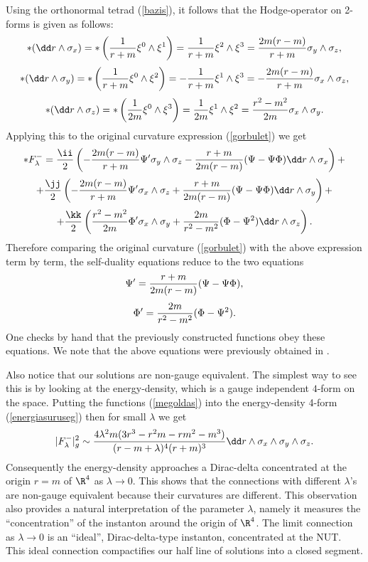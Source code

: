 \documentclass[a4paper,12pt,draft]{article}
\begin{document}
Using the orthonormal tetrad (\ref{bazis}), it follows that the
Hodge-operator on 2-forms is given as follows: 
\[*(\dd r\wedge \sigma_x)= *\left({1\over
r+m}\xi^0\wedge\xi^1   \right)={1\over r+m}\xi^2\wedge\xi^3 =
{2m(r-m)\over r+m}\sigma_y\wedge \sigma_z,\] 
\[*(\dd r\wedge \sigma_y)= *\left({1\over
r+m}\xi^0\wedge\xi^2\right)=-{1\over r+m}\xi^1\wedge\xi^3 =-{2m(r-m)\over
r+m}\sigma_x\wedge \sigma_z,\]
\[*(\dd r\wedge \sigma_z)= *\left({1\over 2m}\xi^0\wedge\xi^3\right)=
{1\over 2m}\xi^1 \wedge\xi^2 = {r^2-m^2\over 2m} \sigma_x\wedge \sigma_y. 
\]
Applying this to the original curvature
expression (\ref{gorbulet}) we get 
\[*F^-_\lambda ={\ii\over 2}\left(-{2m(r-m)\over
r+m}\Psi '\sigma_y\wedge\sigma_z-{r+m\over 2m(r-m)}(\Psi -\Psi\Phi )\dd
r\wedge\sigma_x\right)+   \]
\[+{\jj\over 2}\left( -{2m(r-m)\over r+m}\Psi '\sigma_x\wedge\sigma_z+
{r+m\over 2m(r-m)}(\Psi -\Psi\Phi )\dd r\wedge\sigma_y\right)+\]
\[+{\kk\over 2}\left({r^2-m^2\over 2m}\Phi '\sigma_x\wedge\sigma_y+{2m\over
r^2-m^2}(\Phi -\Psi^2)\dd r\wedge \sigma_z\right) .\]
Therefore comparing the original curvature (\ref{gorbulet}) with the above
expression term by term, the self-duality equations reduce to the two
equations 
\[\Psi '= {r+m\over 2m(r-m)}(\Psi -\Psi\Phi ),\]
\[\Phi '= {2m\over r^2-m^2} (\Phi -\Psi^2). \]
One checks by hand that the previously constructed functions obey these
equations. We note that the above equations were previously obtained in
\cite{kim-yoo}. 

Also notice that our solutions are non-gauge
equivalent. The simplest way to see this is by looking at the
energy-density, which is a gauge independent $4$-form on the space. 
Putting the functions (\ref{megoldas}) into the
energy-density 4-form (\ref{energiasuruseg}) then for small $\lambda$ we
get
\[\vert F^-_\lambda\vert^2_g\sim {4\lambda^2m(3r^3-r^2m-rm^2-m^3)\over
(r-m+\lambda )^4(r+m)^3}\dd r\wedge\sigma_x\wedge\sigma_y\wedge\sigma_z.\]
Consequently the energy-density approaches a Dirac-delta 
concentrated at the origin $r=m$ of $\R^4$ as $\lambda\rightarrow
0$. This shows that the connections with different $\lambda$'s are
non-gauge equivalent because their curvatures are different. This
observation also provides a natural interpretation of the parameter
$\lambda$, namely it measures the ``concentration'' of the instanton 
around the origin of $\R^4$. The limit connection as $\lambda\rightarrow
0$ is an ``ideal'', Dirac-delta-type instanton, concentrated at the NUT. 
This ideal connection compactifies our half line of solutions into a closed
segment. 
\end{document}
